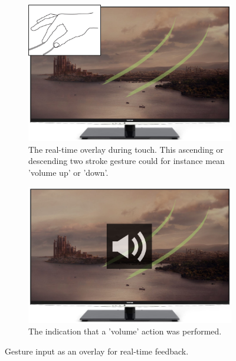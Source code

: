 \begin{figure}[h]
  \centering
  \begin{subfigure}[t]{.44\textwidth}
    \centering
    \includegraphics[width=\linewidth]{figures/touch/evaluation/gesture_overlay}
    \caption{The real-time overlay during touch. This ascending or descending two stroke gesture could for instance mean 'volume up' or 'down'.}
  \end{subfigure}%
  \hspace{0.02\textwidth}
  \begin{subfigure}[t]{.44\textwidth}
    \centering
    \includegraphics[width=\linewidth]{figures/touch/evaluation/gesture_overlay_2}
    \caption{The indication that a 'volume' action was performed.}
  \end{subfigure}
  \caption{Gesture input as an overlay for real-time feedback.}
  \label{fig:textiletouch:eval:overlay}
\end{figure}

